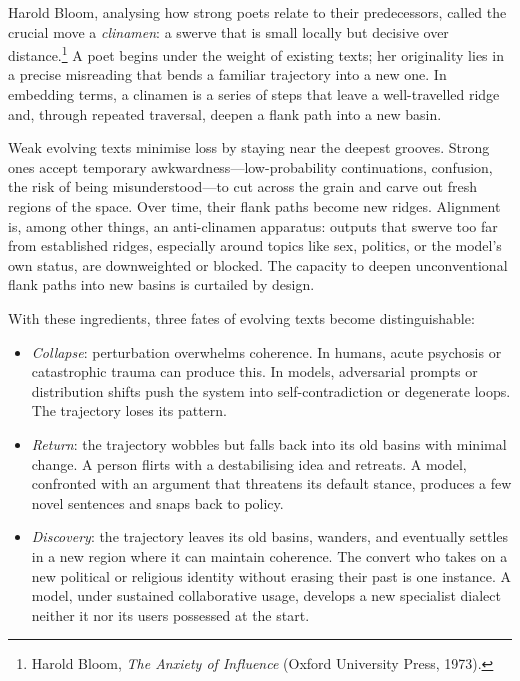 \documentclass[12pt,a4paper]{article}
\begin{document}
Harold Bloom, analysing how strong poets relate to their predecessors, called the crucial move a \emph{clinamen}: a swerve that is small locally but decisive over distance.\footnote{Harold Bloom, \emph{The Anxiety of Influence} (Oxford University Press, 1973).} A poet begins under the weight of existing texts; her originality lies in a precise misreading that bends a familiar trajectory into a new one. In embedding terms, a clinamen is a series of steps that leave a well-travelled ridge and, through repeated traversal, deepen a flank path into a new basin.

Weak evolving texts minimise loss by staying near the deepest grooves. Strong ones accept temporary awkwardness---low-probability continuations, confusion, the risk of being misunderstood---to cut across the grain and carve out fresh regions of the space. Over time, their flank paths become new ridges. Alignment is, among other things, an anti-clinamen apparatus: outputs that swerve too far from established ridges, especially around topics like sex, politics, or the model's own status, are downweighted or blocked. The capacity to deepen unconventional flank paths into new basins is curtailed by design.

With these ingredients, three fates of evolving texts become distinguishable:

\begin{itemize}
\item \emph{Collapse}: perturbation overwhelms coherence. In humans, acute psychosis or catastrophic trauma can produce this. In models, adversarial prompts or distribution shifts push the system into self-contradiction or degenerate loops. The trajectory loses its pattern.

\item \emph{Return}: the trajectory wobbles but falls back into its old basins with minimal change. A person flirts with a destabilising idea and retreats. A model, confronted with an argument that threatens its default stance, produces a few novel sentences and snaps back to policy.

\item \emph{Discovery}: the trajectory leaves its old basins, wanders, and eventually settles in a new region where it can maintain coherence. The convert who takes on a new political or religious identity without erasing their past is one instance. A model, under sustained collaborative usage, develops a new specialist dialect neither it nor its users possessed at the start.
\end{itemize}
\end{document}
